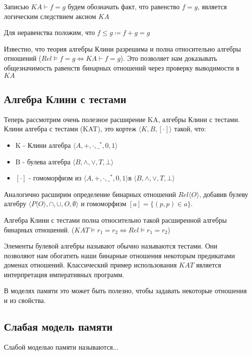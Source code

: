 \documentclass[times
              ]{itmo-student-thesis}
\begin{document}
      Записью $ \mathit{KA} \vdash f = g $ будем обозначать факт, что равенство $ f = g $, является логическим следствием аксиом $ \mathit{KA} $

      Для неравенства положим, что $ f \leq g \coloneqq f + g = g$

      Известно, что теория алгебры Клини разрешима и полна относительно алгебры отношений
      ($ Rel \models f = g \Leftrightarrow \mathit{KA} \vdash f = g$). Это позволяет нам доказывать общезначимость равенств бинарных отношений через проверку выводимости в $ \mathit{KA} $

    \subsection{Алгебра Клини с тестами}
      Теперь рассмотрим очень полезное расширение KA, алгебры Клини с тестами.
      Клини алгебра с тестами (KAT), это кортеж $\langle K, B, [\cdot] \rangle$ такой, что:

      \begin{itemize}
        \item K - Клини алгебра $\langle A, +, \cdot, \_^*, 0, 1 \rangle $
        \item B - булева алгебра $\langle B, \wedge, \vee, T, \bot \rangle $
        \item $ [\cdot] $ - гомоморфизм из $\langle A, +, \cdot, \_^*, 0, 1 \rangle  $в $\langle B, \wedge, \vee, T, \bot \rangle$
      \end{itemize}

      Аналогично расширим определение бинарных отношений $Rel \langle O \rangle $, добавив булеву алгебру $\langle P\langle O \rangle, \cap, \cup, O, \emptyset \rangle$ и гомоморфизм $ [a] = \{(p, p) \in a\} $.

      Алгебра Клини с тестами полна относительно такой расширенной алгебры бинарных отношений.
      ($KAT \models r_1 = r_2 \Leftrightarrow Rel \models r_1 = r_2$)

      Элементы булевой алгебры называют обычно называются тестами. Они позволяют нам обогатить наши бинарные отношения некоторым предикатами доменах отношений. Классический пример использования $ \mathit{KAT} $ является интерпретация императивных программ.

      В моделях памяти это может быть полезно, чтобы задавать некоторые отношения и из свойства.


    \subsection{Слабая модель памяти}
      Слабой моделью памяти называются...
\end{document}
